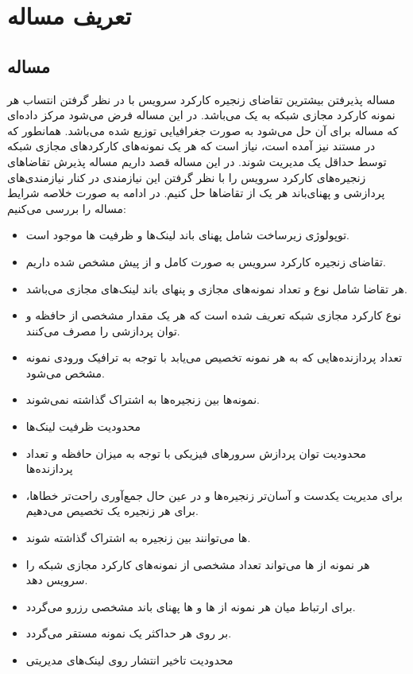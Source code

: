 \chapter{تعریف مساله}

\section{مساله}
مساله
پذیرفتن بیشترین تقاضای زنجیره‌ کارکرد سرویس با در نظر گرفتن انتساب هر نمونه کارکرد مجازی شبکه به یک  می‌باشد.
در این مساله فرض می‌شود مرکز داده‌ای که مساله برای آن حل می‌شود به صورت جغرافیایی توزیع شده می‌باشد.
همانطور که در مستند \cite{ETSI-MAN} نیز آمده است، نیاز است که هر یک نمونه‌های کارکردهای مجازی شبکه
توسط حداقل یک  مدیریت شوند.
در این مساله قصد داریم مساله پذیرش تقاضاهای زنجیره‌های کارکرد سرویس را با نظر گرفتن این نیازمندی در کنار
نیازمندی‌های پردازشی و پهنای‌باند هر یک از تقاضاها حل کنیم.
در ادامه به صورت خلاصه شرایط مساله را بررسی می‌کنیم:

\begin{itemize}
    \item توپولوژی زیرساخت شامل پهنای باند لینک‌ها و ظرفیت ها موجود است.
    \item {} تقاضای زنجیره‌ کارکرد سرویس به صورت کامل و از پیش مشخص شده داریم.
    \item هر تقاضا شامل نوع و تعداد نمونه‌های مجازی و پنهای باند لینک‌های مجازی می‌باشد.
    \item {} نوع کارکرد مجازی شبکه تعریف شده است که هر یک مقدار مشخصی از حافظه و توان پردازشی را مصرف می‌کنند.
    \item تعداد پردازنده‌هایی که به هر نمونه تخصیص می‌یابد با توجه به ترافیک ورودی نمونه مشخص می‌شود.
    \item نمونه‌ها بین زنجیره‌ها به اشتراک گذاشته نمی‌شوند.
    \item محدودیت ظرفیت لینک‌ها
    \item محدودیت توان پردازش سرورهای فیزیکی با توجه به میزان حافظه و تعداد پردازنده‌ها
    \item برای مدیریت یکدست و آسان‌تر زنجیره‌ها و در عین حال جمع‌آوری راحت‌تر خطاها، برای هر زنجیره یک  تخصیص می‌دهیم.
    \item {}ها می‌توانند بین زنجیره به اشتراک گذاشته شوند.
    \item هر نمونه از ها می‌تواند تعداد مشخصی از نمونه‌های کارکرد مجازی شبکه را سرویس دهد. 
    \item برای ارتباط میان هر نمونه از ها و ها پهنای باند مشخصی رزرو می‌گردد.
    \item بر روی هر  حداکثر یک نمونه  مستقر می‌گردد.
    \item محدودیت تاخیر انتشار روی لینک‌های مدیریتی
\end{itemize}

